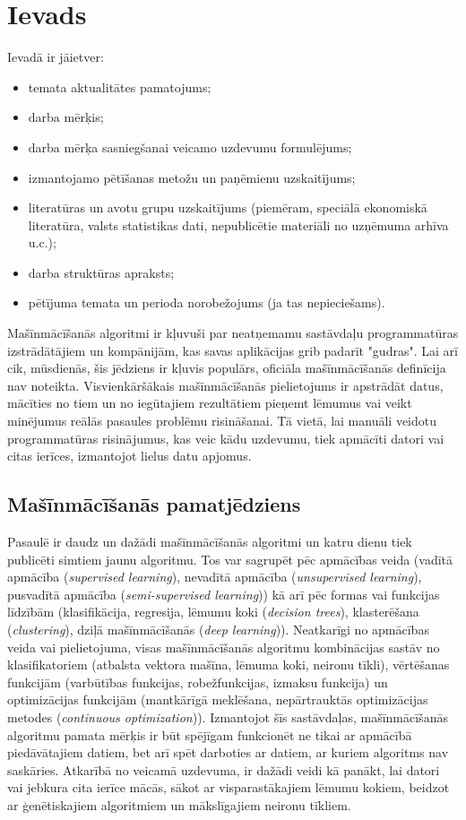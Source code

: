 \chapter{Ievads}
Ievadā ir jāietver:

\begin{itemize}
\item temata aktualitātes pamatojums;
\item darba mērķis;
\item darba mērķa sasniegšanai veicamo uzdevumu formulējums;
\item izmantojamo pētīšanas metožu un paņēmienu uzskaitījums;
\item literatūras un avotu grupu uzskaitījums (piemēram, speciālā ekonomiskā literatūra, valsts statistikas dati, nepublicētie materiāli no uzņēmuma arhīva u.c.);
\item darba struktūras apraksts;
\item pētījuma temata un perioda norobežojums (ja tas nepieciešams).
\end{itemize}

Mašīnmācīšanās algoritmi ir kļuvuši par neatņemamu sastāvdaļu programmatūras izstrādātājiem un kompānijām, kas savas aplikācijas grib padarīt "gudras". Lai arī cik, mūsdienās, šis jēdziens ir kļuvis populārs, oficiāla mašīnmācīšanās definīcija nav noteikta. Visvienkāršākais mašīnmācīšanās pielietojums ir apstrādāt datus, mācīties no tiem un no iegūtajiem rezultātiem pieņemt lēmumus vai veikt minējumus reālās pasaules problēmu risināšanai. Tā vietā, lai manuāli veidotu programmatūras risinājumus, kas veic kādu uzdevumu, tiek apmācīti datori vai citas ierīces, izmantojot lielus datu apjomus. 
\section{Mašīnmācīšanās pamatjēdziens}
Pasaulē ir daudz un dažādi mašīnmācīšanās algoritmi un katru dienu tiek publicēti simtiem jaunu algoritmu. Tos var sagrupēt pēc apmācības veida (vadītā apmācība (\textit{supervised learning}), nevadītā apmācība (\textit{unsupervised learning}), pusvadītā apmācība (\textit{semi-supervised learning})) kā arī pēc formas vai funkcijas līdzībām (klasifikācija, regresija, lēmumu koki (\textit{decision trees}), klasterēšana (\textit{clustering}), dziļā mašīnmācīšanās (\textit{deep learning})). Neatkarīgi no apmācības veida vai pielietojuma, visas mašīnmācīšanās algoritmu kombinācijas sastāv no klasifikatoriem (atbalsta vektora mašīna, lēmuma koki, neironu tīkli), vērtēšanas funkcijām (varbūtības funkcijas, robežfunkcijas, izmaksu funkcija) un optimizācijas funkcijām (mantkārīgā meklēšana, nepārtrauktās optimizācijas metodes (\textit{continuous optimization})). Izmantojot šīs sastāvdaļas, mašīnmācīšanās algoritmu pamata mērķis ir būt spējīgam funkcionēt ne tikai ar apmācībā piedāvātajiem datiem, bet arī spēt darboties ar datiem, ar kuriem algoritms nav saskāries. Atkarībā no veicamā uzdevuma, ir dažādi veidi kā panākt, lai datori vai jebkura cita ierīce mācās, sākot ar visparastākajiem lēmumu kokiem, beidzot ar ģenētiskajiem algoritmiem un mākslīgajiem neironu tīkliem. 


